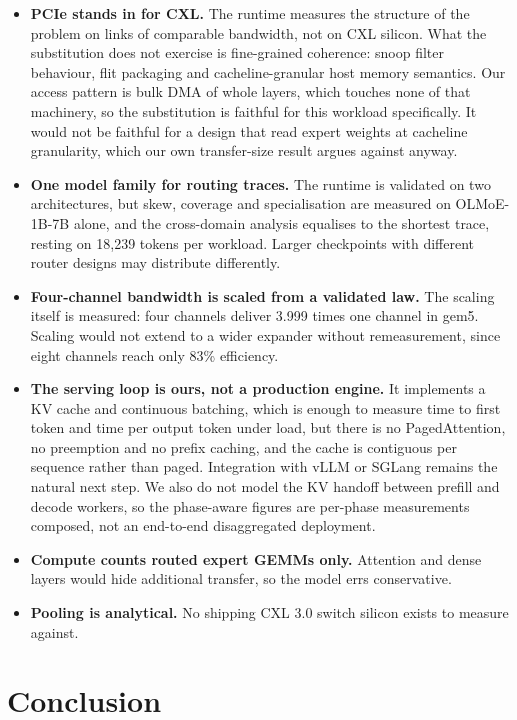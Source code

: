 \documentclass[10pt,a4paper]{article}
\begin{document}
\begin{itemize}
\item \textbf{PCIe stands in for CXL.} The runtime measures the structure of the
problem on links of comparable bandwidth, not on CXL silicon. What the
substitution does not exercise is fine-grained coherence: snoop filter
behaviour, flit packaging and cacheline-granular host memory semantics. Our
access pattern is bulk DMA of whole layers, which touches none of that
machinery, so the substitution is faithful for this workload specifically. It
would not be faithful for a design that read expert weights at cacheline
granularity, which our own transfer-size result argues against anyway.
\item \textbf{One model family for routing traces.} The runtime is validated on
two architectures, but skew, coverage and specialisation are measured on
OLMoE-1B-7B alone, and the cross-domain analysis equalises to the shortest
trace, resting on 18{,}239 tokens per workload. Larger checkpoints with
different router designs may distribute differently.
\item \textbf{Four-channel bandwidth is scaled from a validated law.} The
scaling itself is measured: four channels deliver 3.999 times one channel in gem5.
Scaling would not extend to a wider expander without remeasurement, since eight
channels reach only 83\% efficiency.
\item \textbf{The serving loop is ours, not a production engine.} It implements
a KV cache and continuous batching, which is enough to measure time to first
token and time per output token under load, but there is no PagedAttention, no
preemption and no prefix caching, and the cache is contiguous per sequence
rather than paged. Integration with vLLM or SGLang remains the natural next
step. We also do not model the KV handoff between prefill and decode workers,
so the phase-aware figures are per-phase measurements composed, not an
end-to-end disaggregated deployment.
\item \textbf{Compute counts routed expert GEMMs only.} Attention and dense layers
would hide additional transfer, so the model errs conservative.
\item \textbf{Pooling is analytical.} No shipping CXL 3.0 switch silicon exists to
measure against.
\end{itemize}

\section{Conclusion}
\end{document}

